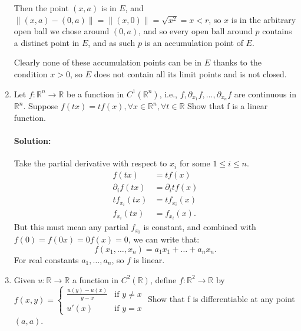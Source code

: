 \documentclass{article}
\begin{document}
\begin{enumerate}
    Then the point $(x,a)$ is in $E$, and $\|(x,a)-(0,a)\|=\|(x,0)\|=\sqrt{x^2} =x<r$, so $x$ is in the arbitrary open ball we chose around $(0,a)$, and so every open ball around $p$ contains a distinct point in $E$, and as such $p$ is an accumulation point of $E$.

    Clearly none of these accumulation points can be in $E$ thanks to the condition $x>0$, so $E$ does not contain all its limit points and is not closed.

\item Let $f : \mathbb{R}^n \to \mathbb{R}$ be a function in $C^1(\mathbb{R}^n)$, i.e., $f, \partial_{x_1} f, ..., \partial_{x_n} f$ are continuous in $\mathbb{R}^n$. Suppose  $f(tx) = t f(x), \forall x \in \mathbb{R}^n, \forall t \in \mathbb{R}$  Show that f is a linear function.  
    \paragraph{Solution: }Take the partial derivative with respect to $x_{i}$ for some $1\leq i\leq n$.
    \begin{align*}
        f(tx)&= tf(x) \\
        \partial_if(tx)&=\partial_i tf(x) \\
        tf_{x_i}(tx)&= tf_{x_{i}}(x) \\
        f_{x_i}(tx)&= f_{x_{i}}(x)
    .\end{align*}
    But this must mean any partial $f_{x_{i}}$ is constant, and combined with $f(0)=f(0x)=0f(x)=0$, we can write that:
    \[
    f(x_1,\dots,x_n)=a_1x_1+\dots+a_nx_n
    .\] For real constants $a_1,\dots,a_n$, so $f$ is linear.

\item Given $u : \mathbb{R} \to \mathbb{R}$ a function in $C^2(\mathbb{R})$, define $f : \mathbb{R}^2 \to \mathbb{R}$ by  $f(x,y) = \begin{cases} \frac{u(y) - u(x)}{y-x} & \text{if } y \neq x \\ u'(x) & \text{if } y = x \end{cases}$  Show that f is differentiable at any point $(a,a)$.  

\end{enumerate}
\end{document}

